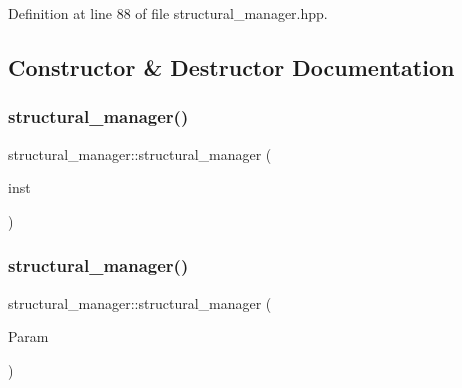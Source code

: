 Definition at line 88 of file structural\+\_\+manager.\+hpp.



\subsection{Constructor \& Destructor Documentation}
\mbox{\label{classstructural__manager_a7b35940c4261bd2b7bd8faa335c783bd}} 
\subsubsection{\texorpdfstring{structural\+\_\+manager()}{structural\_manager()}\hspace{0.1cm}{\footnotesize\ttfamily [1/2]}}
{\footnotesize\ttfamily structural\+\_\+manager\+::structural\+\_\+manager (\begin{DoxyParamCaption}\item[{const \hyperlink{classstructural__manager}{structural\+\_\+manager} \&}]{inst }\end{DoxyParamCaption})\hspace{0.3cm}{\ttfamily [delete]}}

\mbox{\label{classstructural__manager_acf1e3ec619e5155e06bfbfd2300db4a9}} 
\subsubsection{\texorpdfstring{structural\+\_\+manager()}{structural\_manager()}\hspace{0.1cm}{\footnotesize\ttfamily [2/2]}}
{\footnotesize\ttfamily structural\+\_\+manager\+::structural\+\_\+manager (\begin{DoxyParamCaption}\item[{const \hyperlink{Parameter_8hpp_a37841774a6fcb479b597fdf8955eb4ea}{Parameter\+Const\+Ref}}]{Param }\end{DoxyParamCaption})\hspace{0.3cm}{\ttfamily [explicit]}}



